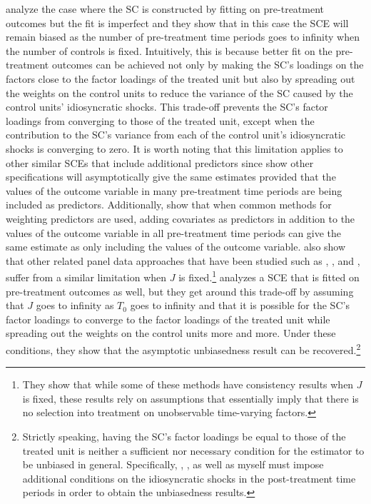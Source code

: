 \documentclass{article}
\begin{document}
\cite{ImperfectFit} analyze the case where the SC is constructed by fitting on pre-treatment outcomes but the fit is imperfect and they show that in this case the SCE will remain biased as the number of pre-treatment time periods goes to infinity when the number of controls is fixed. Intuitively, this is because better fit on the pre-treatment outcomes can be achieved not only by making the SC's loadings on the factors close to the factor loadings of the treated unit but also by spreading out the weights on the control units to reduce the variance of the SC caused by the control units' idiosyncratic shocks. This trade-off prevents the SC's factor loadings from converging to those of the treated unit, except when the contribution to the SC's variance from each of the control unit's idiosyncratic shocks is converging to zero. It is worth noting that this limitation applies to other similar SCEs that include additional predictors since \cite{cherrypicking} show other specifications will asymptotically give the same estimates provided that the values of the outcome variable in many pre-treatment time periods are being included as predictors. Additionally, \cite{IncludingAllLags} show that when common methods for weighting predictors are used, adding covariates as predictors in addition to the values of the outcome variable in all pre-treatment time periods can give the same estimate as only including the values of the outcome variable. \cite{ImperfectFit} also show that other related panel data approaches that have been studied such as \cite{Hsiao2012}, \cite{LiBell2017}, and \cite{MasimiMarcelo2021}, suffer from a similar limitation when $J$ is fixed.\footnote{They show that while some of these methods have consistency results when $J$ is fixed, these results rely on assumptions that essentially imply that there is no selection into treatment on unobservable time-varying factors.} \cite{LargeSampleProperties} analyzes a SCE that is fitted on pre-treatment outcomes as well, but they get around this trade-off by assuming that $J$ goes to infinity as $T_0$ goes to infinity and that it is possible for the SC's factor loadings to converge to the factor loadings of the treated unit while spreading out the weights on the control units more and more. Under these conditions, they show that the asymptotic unbiasedness result can be recovered.\footnote{Strictly speaking, having the SC's factor loadings be equal to those of the treated unit is neither a sufficient nor necessary condition for the estimator to be unbiased in general. Specifically, \cite{Abadie2010}, \cite{LargeSampleProperties}, as well as myself must impose additional conditions on the idiosyncratic shocks in the post-treatment time periods in order to obtain the unbiasedness results.} 
\end{document}
